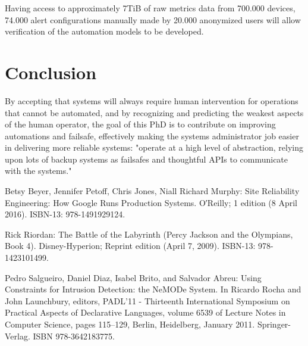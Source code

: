 \documentclass{llncs}
\begin{document}
Having access to approximately 7TiB of raw metrics data from 700.000 devices, 74.000 alert configurations manually made by 20.000 anonymized users will allow verification of the automation models to be developed.
%
\section{Conclusion}
%
By accepting that systems will always require human intervention for operations that cannot be automated, and by recognizing and predicting the weakest aspects of the human operator, the goal of this PhD is to contribute on improving automations and failsafe, effectively making the systems administrator job easier in delivering more reliable systems: "operate at a high level of abstraction, relying upon lots of backup systems as failsafes and thoughtful APIs to communicate with the systems."\cite{bet:mur}
%
%
\begin{thebibliography}{5}
%
Betsy Beyer, Jennifer Petoff, Chris Jones, Niall Richard Murphy:
Site Reliability Engineering: How Google Runs Production Systems.
O′Reilly; 1 edition (8 April 2016).
ISBN-13: 978-1491929124.

Rick Riordan:
The Battle of the Labyrinth (Percy Jackson and the Olympians, Book 4).
Disney-Hyperion; Reprint edition (April 7, 2009).
ISBN-13: 978-1423101499.

Pedro Salgueiro, Daniel Diaz, Isabel Brito, and Salvador Abreu:
Using Constraints for Intrusion Detection: the NeMODe System.
In Ricardo Rocha and John Launchbury, editors, PADL’11 - Thirteenth International Symposium on Practical Aspects of Declarative Languages, volume 6539 of Lecture Notes in Computer
Science, pages 115–129, Berlin, Heidelberg, January 2011. Springer-Verlag.
ISBN 978-3642183775.

\end{thebibliography}

\clearpage
\end{document}
